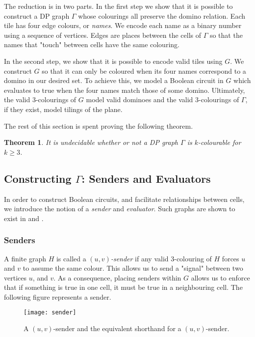 \documentclass[letterpaper]{article}
\newtheorem{theorem}{Theorem}[section]
\begin{document}
The reduction is in two parts.
In the first step we show that it is possible to construct a DP graph $\Gamma$ whose colourings all preserve the domino relation.
Each tile has four edge colours, or \emph{names}.
We encode each name as a binary number using a sequence of vertices.
Edges are places between the cells of $\Gamma$ so that the names that "touch" between cells have the same colouring.

In the second step, we show that it is possible to encode valid tiles using $G$.
We construct $G$ so that it can only be coloured when its four names correspond to a domino in our desired set.
To achieve this, we model a Boolean circuit in $G$ which evaluates to true when the four names match those of some domino.
Ultimately, the valid 3-colourings of $G$ model valid dominoes and the valid 3-colourings of $\Gamma$, if they exist, model tilings of the plane.

The rest of this section is spent proving the following theorem.

\begin{theorem}
It is undecidable whether or not a DP graph $\Gamma$ is $k$-colourable for $k \geq 3$.
\end{theorem}

\subsection{Constructing $\Gamma$: Senders and Evaluators}

In order to construct Boolean circuits, and facilitate relationships between cells, we introduce the notion of a \emph{sender} and \emph{evaluator}.
Such graphs are shown to exist in \cite{burr84} and \cite{burr90}.

\subsubsection{Senders}
A finite graph $H$ is called a $(u,v)$\emph{-sender} if any valid 3-colouring of $H$ forces $u$ and $v$ to assume the same colour. \cite{burr84}
This allows us to send a "signal" between two vertices $u$, and $v$.
As a consequence, placing senders within $G$ allows us to enforce that if something is true in one cell, it must be true in a neighbouring cell. The following figure represents a sender.

\begin{figure}[H]
\centering
\caption{A $(u,v)$-sender and the equivalent shorthand for a $(u,v)$-sender.}
\texttt{[image: sender]}
\end{figure}
\end{document}

